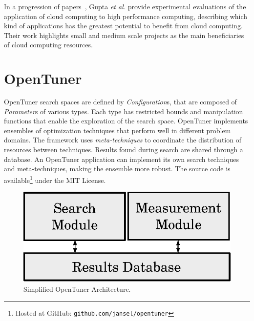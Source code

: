 \documentclass[a4paper, 12pt]{article}
\begin{document}
In a progression of papers~\cite{gupta2012exploring,gupta2014evaluating,gupta2013hpccloud},
Gupta \emph{et al.} provide experimental evaluations of the application of
cloud computing to high performance computing, describing which kind of
applications has the greatest potential to benefit from cloud computing.
Their work highlights small and medium scale projects as the main beneficiaries
of cloud computing resources.


\section{OpenTuner} \label{sec:ot}

OpenTuner search spaces are defined by \emph{Configuration}s, that are composed
of \emph{Parameter}s of various types. Each type has restricted bounds and
manipulation functions that enable the exploration of the search space.
OpenTuner implements ensembles of optimization techniques that
perform well in different problem domains. The framework uses
\emph{meta-techniques} to coordinate the distribution of resources
between techniques.
Results found during search are shared through a
database. An OpenTuner application can implement its own search
techniques and meta-techniques, making the ensemble more robust.
The source code is available\footnote{Hosted at GitHub:
\texttt{\scriptsize github.com/jansel/opentuner}} under the MIT License.

\begin{figure}[htpb]
    \centering
    \includegraphics[scale=.62]{opentuner-implementation}
    \caption{Simplified OpenTuner Architecture.}
    \label{fig:ot-imp}
\end{figure}
\end{document}
